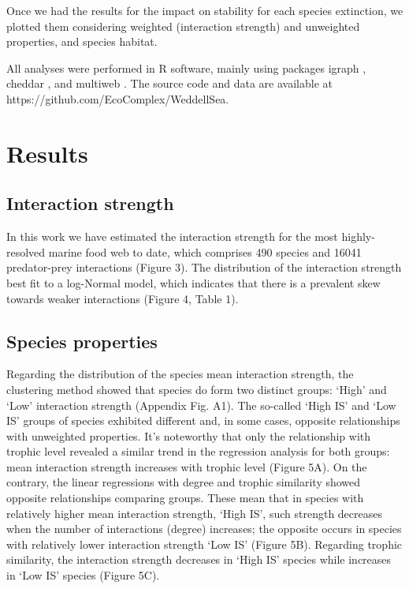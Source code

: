 \documentclass[gc, manuscript]{copernicus}
\begin{document}
Once we had the results for the impact on stability for each species
extinction, we plotted them considering weighted (interaction strength)
and unweighted properties, and species habitat.

All analyses were performed in R software, mainly using packages igraph
\citep{Csardi2005}, cheddar \citep{Hudson2013}, and multiweb
\citep{Saravia2019}. The source code and data are available at
https://github.com/EcoComplex/WeddellSea.

\section{Results}

\subsection{Interaction strength}

In this work we have estimated the interaction strength for the most
highly-resolved marine food web to date, which comprises 490 species and
16041 predator-prey interactions (Figure 3). The distribution of the
interaction strength best fit to a log-Normal model, which indicates
that there is a prevalent skew towards weaker interactions (Figure 4,
Table 1).

\subsection{Species properties}

Regarding the distribution of the species mean interaction strength, the
clustering method showed that species do form two distinct groups:
`High' and `Low' interaction strength (Appendix Fig. A1). The so-called
`High IS' and `Low IS' groups of species exhibited different and, in
some cases, opposite relationships with unweighted properties. It's
noteworthy that only the relationship with trophic level revealed a
similar trend in the regression analysis for both groups: mean
interaction strength increases with trophic level (Figure 5A). On the
contrary, the linear regressions with degree and trophic similarity
showed opposite relationships comparing groups. These mean that in
species with relatively higher mean interaction strength, `High IS',
such strength decreases when the number of interactions (degree)
increases; the opposite occurs in species with relatively lower
interaction strength `Low IS' (Figure 5B). Regarding trophic similarity,
the interaction strength decreases in `High IS' species while increases
in `Low IS' species (Figure 5C).
\end{document}

